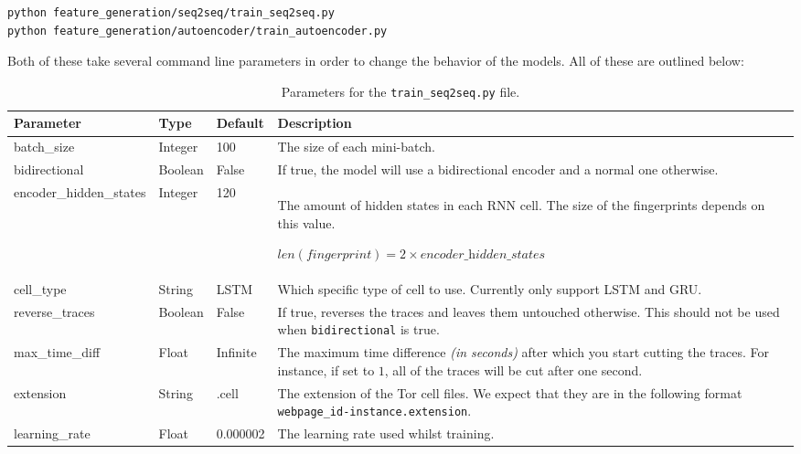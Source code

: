 \begin{lstlisting}[language=Bash]
python feature_generation/seq2seq/train_seq2seq.py
python feature_generation/autoencoder/train_autoencoder.py
\end{lstlisting}

Both of these take several command line parameters in order to change the behavior of the models.
All of these are outlined below:

\newpage

\begin{table}[ht]
  \centering
  \begin{tabular}{ l | l | l | p{} }
    \textbf{Parameter} & \textbf{Type} & \textbf{Default} & \textbf{Description} \\ \hline \hline
    batch\_size & Integer & 100 & The size of each mini-batch. \\ \hline
    bidirectional & Boolean & False & If true, the model will use a bidirectional encoder and a normal one otherwise. \\ \hline
    encoder\_hidden\_states & Integer & 120 & The amount of hidden states in each RNN cell. The size of the fingerprints depends on this value. \par $\textit{len}(\textit{fingerprint}) = 2 \times \textit{encoder\_hidden\_states}$ \\ \hline
    cell\_type & String & LSTM & Which specific type of cell to use. Currently only support LSTM and GRU. \\ \hline
    reverse\_traces & Boolean & False & If true, reverses the traces and leaves them untouched otherwise. This should not be used when \texttt{bidirectional} is true. \\ \hline
    max\_time\_diff & Float & Infinite & The maximum time difference \textit{(in seconds)} after which you start cutting the traces. For instance, if set to $1$, all of the traces will be cut after one second.\\ \hline
    extension & String & .cell & The extension of the Tor cell files. We expect that they are in the following format \texttt{webpage\_id-instance.extension}. \\ \hline
    learning\_rate & Float & 0.000002 & The learning rate used whilst training.
  \end{tabular}
  \caption{Parameters for the \texttt{train\_seq2seq.py} file.}
\end{table}

